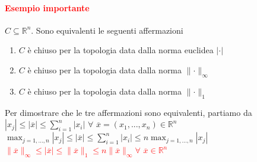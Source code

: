 \documentclass{article}
\newcommand{\R}{\mathbb{R}}
\begin{document}
\paragraph{\textcolor{red}{Esempio importante}}
$C\subseteq \R^n$. Sono equivalenti le seguenti affermazioni
\begin{enumerate}
    \item $C$ è chiuso per la topologia data dalla norma euclidea $|\cdot|$
    \item $C$ è chiuso per la topologia data dalla norma $\parallel \cdot \parallel_\infty$
    \item $C$ è chiuso per la topologia data dalla norma $\parallel \cdot \parallel_1$
\end{enumerate}
Per dimostrare che le tre affermazioni sono equivalenti, partiamo da\\
$|x_j|\leq |\overline{x}| \leq \sum_{i=1}^{n}|x_i| \,\,\forall\,\, \overline{x}=(x_1,...,x_n)\in \R^n$\\
$\max_{j=1,...,n}|x_j| \leq |\overline{x}| \leq \sum_{i=1}^{n}|x_i| \leq n \max_{j=1,...,n}|x_j|$\\
\textcolor{red}{$\parallel \overline{x} \parallel_\infty \leq |\overline{x}| \leq \parallel \overline{x} \parallel_1 \leq n \parallel \overline{x} \parallel_\infty \forall\,\, \overline{x} \in \R^n$}
\end{document}
